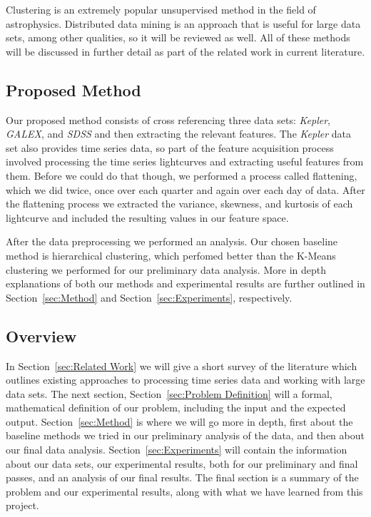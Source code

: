 \documentclass[12pt]{article}
\begin{document}
Clustering is an extremely popular unsupervised method in the field of astrophysics.
Distributed data mining is an approach that is useful for large data sets, among other qualities, so it will be reviewed as well.
All of these methods will be discussed in further detail as part of the related work in current literature.


\subsection{Proposed Method} %
\label{sub:Proposed Method}
Our proposed method consists of cross referencing three data sets: \textit{Kepler}, \textit{GALEX}, and \textit{SDSS} and then extracting the relevant features.
The \textit{Kepler} data set also provides time series data, so part of the feature acquisition process involved processing the time series lightcurves and extracting useful features from them.
Before we could do that though, we performed a process called flattening, which we did twice, once over each quarter and again over each day of data.
After the flattening process we extracted the variance, skewness, and kurtosis of each lightcurve and included the resulting values in our feature space.

After the data preprocessing we performed an analysis.
Our chosen baseline method is hierarchical clustering, which perfomed better than the K-Means clustering we performed for our preliminary data analysis. 
More in depth explanations of both our methods and experimental results are further outlined in Section~\ref{sec:Method} and Section~\ref{sec:Experiments}, respectively.


\subsection{Overview} %
\label{sub:Overview}
In Section~\ref{sec:Related Work} we will give a short survey of the literature which outlines existing approaches to processing time series data and working with large data sets.
The next section, Section~\ref{sec:Problem Definition} will a formal, mathematical definition of our problem, including the input and the expected output.
Section~\ref{sec:Method} is where we will go more in depth, first about the baseline methods we tried in our preliminary analysis of the data, and then about our final data analysis.
Section~\ref{sec:Experiments} will contain the information about our data sets, our experimental results, both for our preliminary and final passes, and an analysis of our final results.
The final section is a summary of the problem and our experimental results, along with what we have learned from this project.
\end{document}
